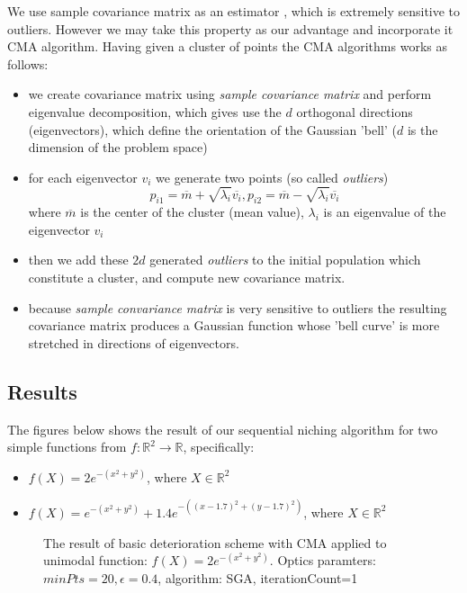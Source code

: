 We use sample covariance matrix as an estimator \cite{covariance}, which is 
extremely sensitive to outliers. However we may take this property as our
advantage and incorporate it CMA algorithm. 
Having given a cluster of points the CMA algorithms works as follows:

\begin{itemize}
  \item we create covariance matrix using \textit{sample covariance matrix}
  \cite{covariance} and perform eigenvalue decomposition, which gives use the
  $d$ orthogonal directions (eigenvectors), which define the orientation of the 
  Gaussian 'bell' ($d$ is the dimension of the problem space)
  \item for each eigenvector $v_i$ we generate two points (so called
  \textit{outliers})
  \begin{equation}
  	p_{i1} = \overline{m} + \sqrt{\lambda_i}\overline{v_i}, 
  	p_{i2} = \overline{m} - \sqrt{\lambda_i}\overline{v_i}
  \end{equation} 
  where $\overline{m}$ is the center of the cluster (mean value), $\lambda_i$ is
  an eigenvalue of the eigenvector $v_i$
  \item then we add these $2d$ generated \textit{outliers} to the initial
  population which constitute a cluster, and compute new covariance matrix.
  \item because \textit{sample convariance matrix} is very sensitive to outliers
  the resulting covariance matrix produces a Gaussian function whose 'bell
  curve' is more stretched in directions of eigenvectors.
  \end{itemize}

\subsection{Results}

The figures below shows the result of our sequential niching algorithm for two
simple functions from $f:\mathbb{R}^2 \rightarrow \mathbb{R}$, specifically:
\begin{itemize}
  \item $f(X) = 2e^{-(x^2 + y^2)}$, where $X \in \mathbb{R}^2$
  \item $f(X) = e^{-(x^2 + y^2)}+1.4e^{-((x-1.7)^2 + (y-1.7)^2)}$, where $X \in
  \mathbb{R}^2$
\end{itemize}

\begin{figure}
  \centering
  \caption{The result of basic deterioration scheme with CMA 
  applied to unimodal function: $f(X) = 2e^{-(x^2 +y^2)}$.
  Optics paramters: $minPts=20, \epsilon=0.4$, algorithm: SGA, iterationCount=1}
  \label{det1}
\end{figure}

